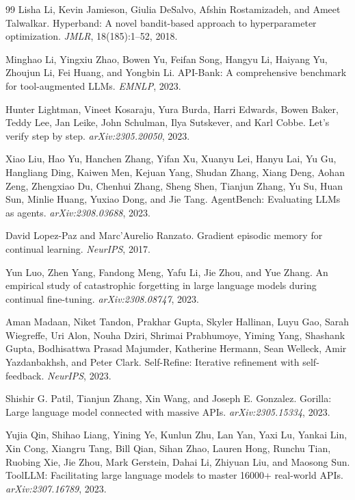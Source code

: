 \documentclass{article}
\begin{document}
\begin{thebibliography}{99}
Lisha Li, Kevin Jamieson, Giulia DeSalvo, Afshin Rostamizadeh, and Ameet Talwalkar.
\newblock Hyperband: A novel bandit-based approach to hyperparameter optimization.
\newblock \emph{JMLR}, 18(185):1--52, 2018.

Minghao Li, Yingxiu Zhao, Bowen Yu, Feifan Song, Hangyu Li, Haiyang Yu, Zhoujun Li, Fei Huang, and Yongbin Li.
\newblock API-Bank: A comprehensive benchmark for tool-augmented LLMs.
\newblock \emph{EMNLP}, 2023.

Hunter Lightman, Vineet Kosaraju, Yura Burda, Harri Edwards, Bowen Baker, Teddy Lee, Jan Leike, John Schulman, Ilya Sutskever, and Karl Cobbe.
\newblock Let's verify step by step.
\newblock \emph{arXiv:2305.20050}, 2023.

Xiao Liu, Hao Yu, Hanchen Zhang, Yifan Xu, Xuanyu Lei, Hanyu Lai, Yu Gu, Hangliang Ding, Kaiwen Men, Kejuan Yang, Shudan Zhang, Xiang Deng, Aohan Zeng, Zhengxiao Du, Chenhui Zhang, Sheng Shen, Tianjun Zhang, Yu Su, Huan Sun, Minlie Huang, Yuxiao Dong, and Jie Tang.
\newblock AgentBench: Evaluating LLMs as agents.
\newblock \emph{arXiv:2308.03688}, 2023.

David Lopez-Paz and Marc'Aurelio Ranzato.
\newblock Gradient episodic memory for continual learning.
\newblock \emph{NeurIPS}, 2017.

Yun Luo, Zhen Yang, Fandong Meng, Yafu Li, Jie Zhou, and Yue Zhang.
\newblock An empirical study of catastrophic forgetting in large language models during continual fine-tuning.
\newblock \emph{arXiv:2308.08747}, 2023.

Aman Madaan, Niket Tandon, Prakhar Gupta, Skyler Hallinan, Luyu Gao, Sarah Wiegreffe, Uri Alon, Nouha Dziri, Shrimai Prabhumoye, Yiming Yang, Shashank Gupta, Bodhisattwa Prasad Majumder, Katherine Hermann, Sean Welleck, Amir Yazdanbakhsh, and Peter Clark.
\newblock Self-Refine: Iterative refinement with self-feedback.
\newblock \emph{NeurIPS}, 2023.

Shishir G. Patil, Tianjun Zhang, Xin Wang, and Joseph E. Gonzalez.
\newblock Gorilla: Large language model connected with massive APIs.
\newblock \emph{arXiv:2305.15334}, 2023.

Yujia Qin, Shihao Liang, Yining Ye, Kunlun Zhu, Lan Yan, Yaxi Lu, Yankai Lin, Xin Cong, Xiangru Tang, Bill Qian, Sihan Zhao, Lauren Hong, Runchu Tian, Ruobing Xie, Jie Zhou, Mark Gerstein, Dahai Li, Zhiyuan Liu, and Maosong Sun.
\newblock ToolLLM: Facilitating large language models to master 16000+ real-world APIs.
\newblock \emph{arXiv:2307.16789}, 2023.


\end{thebibliography}
\end{document}
